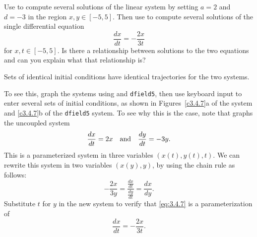 \documentclass{ximera}
\begin{document}
\begin{computerExercise} \label{c3.4.7}
Use {\pplane} to compute several solutions of the linear system by
setting $a=2$ and $d=-3$ in the region $x,y\in[-5,5]$.  Then use
{\dfield} to compute several solutions of the single differential
equation
\[
\frac{dx}{dt} = -\frac{2x}{3t}
\]
for $x,t\in[-5,5]$.  Is there a relationship between solutions to the
two equations and can you explain what that relationship is?

\begin{solution}

\ans Sets of identical initial conditions have identical trajectories
for the two systems. 

\soln To see this, graph the systems using {\pplane} and
{\tt dfield5}, then use keyboard input to enter several sets of initial
conditions, as shown in Figures~\ref{c3.4.7}a of the {\pplane} system
and \ref{c3.4.7}b of the {\tt dfield5} system.  To see why this is the case,
note that {\pplane} graphs the uncoupled system
\begin{equation} \label{eq:3.4.7}
\frac{dx}{dt} = 2x \quad\mbox{and}\quad \frac{dy}{dt} = -3y.
\end{equation}
This is a parameterized system in three variables $(x(t),y(t),t)$.
We can rewrite this system in two variables $(x(y),y)$, by using the
chain rule as follows:
\[ 
-\frac{2x}{3y} = \frac{\frac{dx}{dt}}{\frac{dy}{dt}} = \frac{dx}{dy}. 
\]
Substitute $t$ for $y$ in the new system to verify that \eqref{eq:3.4.7}
is a parameterization of
\[ 
\frac{dx}{dt} = -\frac{2x}{3t}. 
\]
\begin{figure}[htb]
			\centerline{%
			}
\end{figure}
\end{solution}
\end{computerExercise}
\end{document}
